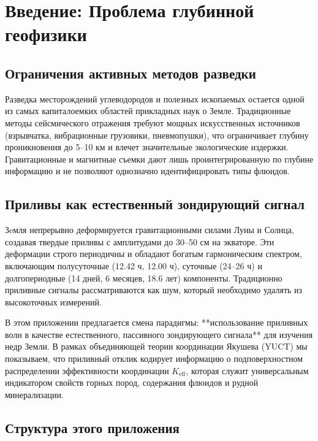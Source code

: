 \documentclass[12pt,a4paper]{article}
\theoremstyle{remark}
\newcommand{\Keff}{K_{\mathrm{eff}}}
\begin{document}
	\tableofcontents
	\newpage
	
	\section{Введение: Проблема глубинной геофизики}
	\label{sec:intro}
	
	\subsection{Ограничения активных методов разведки}
	
	Разведка месторождений углеводородов и полезных ископаемых остается одной из самых капиталоемких областей прикладных наук о Земле. Традиционные методы сейсмического отражения требуют мощных искусственных источников (взрывчатка, вибрационные грузовики, пневмопушки), что ограничивает глубину проникновения до 5–10 км и влечет значительные экологические издержки. Гравитационные и магнитные съемки дают лишь проинтегрированную по глубине информацию и не позволяют однозначно идентифицировать типы флюидов.
	
	\subsection{Приливы как естественный зондирующий сигнал}
	
	Зeмля непрерывно деформируется гравитационными силами Луны и Солнца, создавая твердые приливы с амплитудами до 30–50 см на экваторе. Эти деформации строго периодичны и обладают богатым гармоническим спектром, включающим полусуточные (12.42 ч, 12.00 ч), суточные (24–26 ч) и долгопериодные (14 дней, 6 месяцев, 18.6 лет) компоненты. Традиционно приливные сигналы рассматриваются как шум, который необходимо удалять из высокоточных измерений.
	
	В этом приложении предлагается смена парадигмы: **использование приливных волн в качестве естественного, пассивного зондирующего сигнала** для изучения недр Земли. В рамках объединяющей теории координации Якушева (YUCT) мы показываем, что приливный отклик кодирует информацию о подповерхностном распределении эффективности координации $\Keff$, которая служит универсальным индикатором свойств горных пород, содержания флюидов и рудной минерализации.
	
	\subsection{Структура этого приложения}
	
\end{document}
